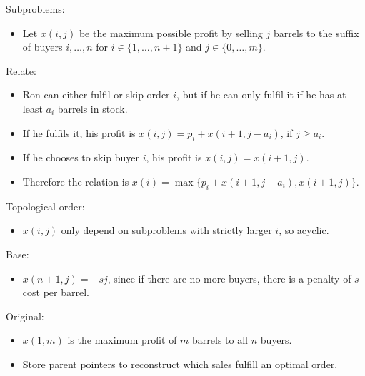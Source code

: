 \documentclass[12pt,twoside]{article}
\begin{document}


\begin{problems}

\problem  %

Subproblems:
\begin{itemize}
    \item Let $x(i,j)$ be the maximum possible profit by selling $j$ barrels to the suffix of buyers $i,\ldots,n$ for $i \in \{1,\ldots,n+1\}$ and $j \in \{0,\ldots,m\}$.
\end{itemize}

Relate:
\begin{itemize}
    \item Ron can either fulfil or skip order $i$, but if he can only fulfil it if he has at least $a_i$ barrels in stock.
    \item If he fulfils it, his profit is $x(i,j)=p_i+x(i+1,j-a_i)$, if $j \geq a_i$.
    \item If he chooses to skip buyer $i$, his profit is $x(i,j)=x(i+1,j)$.
    \item Therefore the relation is $x(i)=\max\{p_i+x(i+1,j-a_i),x(i+1,j)\}$.
\end{itemize}

Topological order:
\begin{itemize}
    \item $x(i,j)$ only depend on subproblems with strictly larger $i$, so acyclic.
\end{itemize}

Base:
\begin{itemize}
    \item $x(n+1,j)=-sj$, since if there are no more buyers, there is a penalty of $s$ cost per barrel.
\end{itemize}

Original:
\begin{itemize}
    \item $x(1,m)$ is the maximum profit of $m$ barrels to all $n$ buyers.
    \item Store parent pointers to reconstruct which sales fulfill an optimal order.
\end{itemize}


\end{problems}
\end{document}

